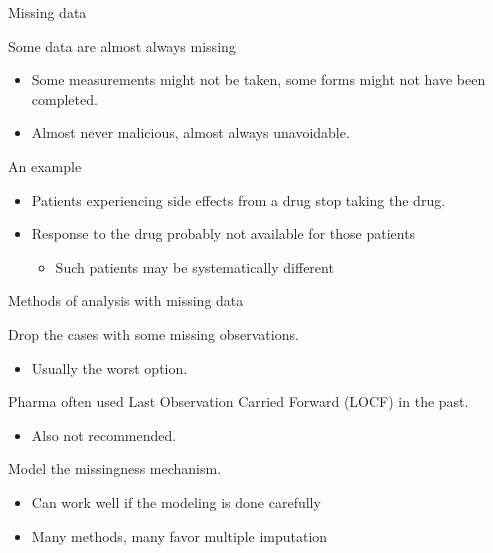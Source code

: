 \documentclass[ignorenonframetext,]{beamer}
\begin{document}
\begin{frame}{Missing data}

Some data are almost always missing

\begin{itemize}
\item
  Some measurements might not be taken, some forms might not have been
  completed.
\item
  Almost never malicious, almost always unavoidable.
\end{itemize}

An example

\begin{itemize}
\item
  Patients experiencing side effects from a drug stop taking the drug.
\item
  Response to the drug probably not available for those patients

  \begin{itemize}
  \itemsep1pt\parskip0pt
  \item
    \normalsize{Such patients may be systematically different}
  \end{itemize}
\end{itemize}

\end{frame}

\begin{frame}{Methods of analysis with missing data}

Drop the cases with some missing observations.

\begin{itemize}
\itemsep1pt\parskip0pt
\item
  Usually the worst option.
\end{itemize}

Pharma often used Last Observation Carried Forward (LOCF) in the past.

\begin{itemize}
\itemsep1pt\parskip0pt
\item
  Also not recommended.
\end{itemize}

Model the missingness mechanism.

\begin{itemize}
\item
  Can work well if the modeling is done carefully
\item
  Many methods, many favor multiple imputation
\end{itemize}

\end{frame}
\end{document}
